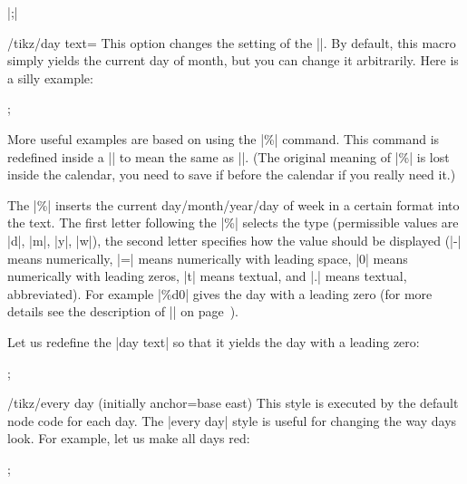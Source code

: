 \begin{command}{\calendar {}|;|}
    \begin{key}{/tikz/day text=}
        This option changes the setting of the |\tikzdaytext|. By default, this
        macro simply yields the current day of month, but you can change it
        arbitrarily. Here is a silly example:
\begin{codeexample}[preamble={\usetikzlibrary{calendar}}]
\tikz \calendar[dates=2000-01-01 to 2000-01-31,week list,
                day text=x];
\end{codeexample}
        More useful examples are based on using the |\%| command. This command
        is redefined inside a |\pgfcalendar| to mean the same as
        |\pgfcalendarshorthand|. (The original meaning of |\%| is lost inside
        the calendar, you need to save if before the calendar if you really
        need it.)

        The |\%| inserts the current day/month/year/day of week in a certain
        format into the text. The first letter following the |\%| selects the
        type (permissible values are |d|, |m|, |y|, |w|), the second letter
        specifies how the value should be displayed (|-| means numerically, |=|
        means numerically with leading space, |0| means numerically with
        leading zeros, |t| means textual, and |.| means textual, abbreviated).
        For example |\%d0| gives the day with a leading zero (for more details
        see the description of |\pgfcalendarshorthand| on
        page~\pageref{pgfcalendarshorthand}).

        Let us redefine the |day text| so that it yields the day with a leading
        zero:
\begin{codeexample}[leave comments,preamble={\usetikzlibrary{calendar}}]
\tikz \calendar[dates=2000-01-01 to 2000-01-31,week list,
                day text=\%d0];
\end{codeexample}
    \end{key}

    \begin{key}{/tikz/every day (initially anchor=base east)}
        This style is executed by the default node code for each day. The
        |every day| style is useful for changing the way days look. For
        example, let us make all days red:
\begin{codeexample}[leave comments,preamble={\usetikzlibrary{calendar}}]
\tikz[every day/.style=red]
  \calendar[dates=2000-01-01 to 2000-01-31,week list];
\end{codeexample}
    \end{key}



\end{command}
